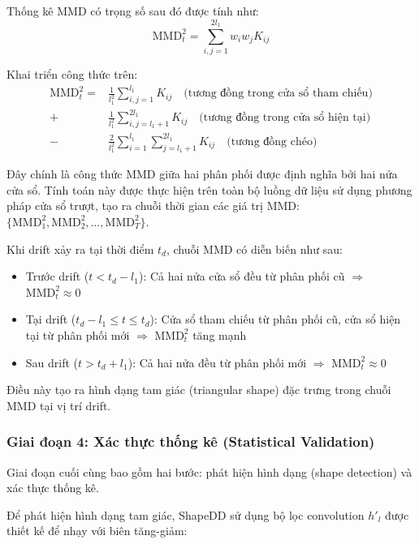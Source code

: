 Thống kê MMD có trọng số sau đó được tính như:
\begin{equation}
	\text{MMD}^2_t = \sum_{i,j=1}^{2l_1} w_i w_j K_{ij}
\end{equation}

Khai triển công thức trên:
\begin{align}
	\text{MMD}^2_t = & \frac{1}{l_1^2} \sum_{i,j=1}^{l_1} K_{ij} \quad \text{(tương đồng trong cửa sổ tham chiếu)} \nonumber    \\
	+                & \frac{1}{l_1^2} \sum_{i,j=l_1+1}^{2l_1} K_{ij} \quad \text{(tương đồng trong cửa sổ hiện tại)} \nonumber \\
	-                & \frac{2}{l_1^2} \sum_{i=1}^{l_1} \sum_{j=l_1+1}^{2l_1} K_{ij} \quad \text{(tương đồng chéo)}
\end{align}

Đây chính là công thức MMD giữa hai phân phối được định nghĩa bởi hai nửa cửa sổ. Tính toán này được thực hiện trên toàn bộ luồng dữ liệu sử dụng phương pháp cửa sổ trượt, tạo ra chuỗi thời gian các giá trị MMD: $\{\text{MMD}^2_1, \text{MMD}^2_2, \ldots, \text{MMD}^2_T\}$.

Khi drift xảy ra tại thời điểm $t_d$, chuỗi MMD có diễn biến như sau:
\begin{itemize}
	\item Trước drift ($t < t_d - l_1$): Cả hai nửa cửa sổ đều từ phân phối cũ $\Rightarrow$ $\text{MMD}^2_t \approx 0$
	\item Tại drift ($t_d - l_1 \leq t \leq t_d$): Cửa sổ tham chiếu từ phân phối cũ, cửa sổ hiện tại từ phân phối mới $\Rightarrow$ $\text{MMD}^2_t$ tăng mạnh
	\item Sau drift ($t > t_d + l_1$): Cả hai nửa đều từ phân phối mới $\Rightarrow$ $\text{MMD}^2_t \approx 0$
\end{itemize}

Điều này tạo ra hình dạng tam giác (triangular shape) đặc trưng trong chuỗi MMD tại vị trí drift.

\subsubsection{Giai đoạn 4: Xác thực thống kê (Statistical Validation)}

Giai đoạn cuối cùng bao gồm hai bước: phát hiện hình dạng (shape detection) và xác thực thống kê.

Để phát hiện hình dạng tam giác, ShapeDD sử dụng bộ lọc convolution $h'_l$ được thiết kế để nhạy với biên tăng-giảm:

